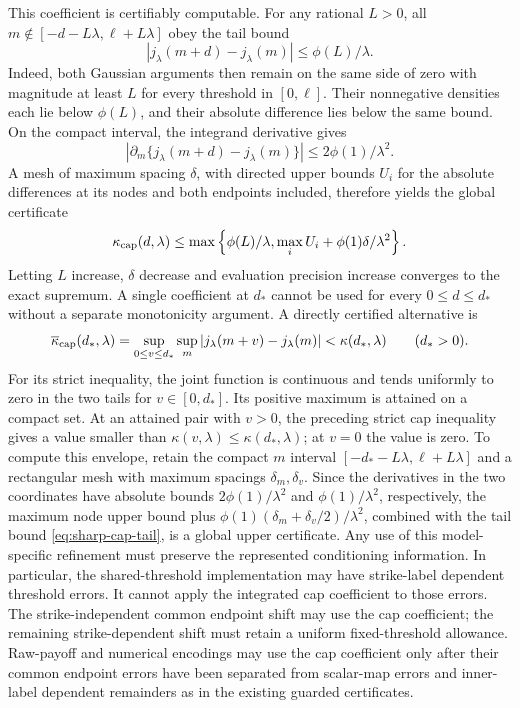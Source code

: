 \documentclass[11pt]{article}
\begin{document}
This coefficient is certifiably computable. For any rational $L>0$, all
$m\notin[-d-L\lambda,\ell+L\lambda]$ obey the tail bound
\begin{equation}
 |j_\lambda(m+d)-j_\lambda(m)|\leq\phi(L)/\lambda.
 \label{eq:sharp-cap-tail}
\end{equation}
Indeed, both Gaussian arguments then remain on the same side of zero
with magnitude at least $L$ for every threshold in $[0,\ell]$.
Their nonnegative densities each lie below $\phi(L)$, and their
absolute difference lies below the same bound. On the compact interval,
the integrand derivative gives
\begin{equation}
 |\partial_m\{j_\lambda(m+d)-j_\lambda(m)\}|
                         \leq2\phi(1)/\lambda^2.
 \label{eq:sharp-cap-mesh-Lipschitz}
\end{equation}
A mesh of maximum spacing $\delta$, with directed upper bounds $U_i$
for the absolute differences at its nodes and both endpoints included,
therefore yields the global certificate
\begin{equation}
 \kappa_{\rm cap}(d,\lambda)
 \leq\max\left\{\phi(L)/\lambda,
                       \max_i U_i+\phi(1)\delta/\lambda^2\right\}.
 \label{eq:sharp-cap-mesh-certificate}
\end{equation}
Letting $L$ increase, $\delta$ decrease and evaluation precision increase
converges to the exact supremum. A single coefficient at $d_*$ cannot be
used for every $0\leq d\leq d_*$ without a separate monotonicity argument.
A directly certified alternative is
\begin{equation}
 \overline\kappa_{\rm cap}(d_*,\lambda)
 =\sup_{0\leq v\leq d_*}\sup_m
                  |j_\lambda(m+v)-j_\lambda(m)|
 <\kappa(d_*,\lambda)\qquad(d_*>0).
 \label{eq:sharp-cap-uniform-gap-envelope}
\end{equation}
For its strict inequality, the joint function is continuous and tends
uniformly to zero in the two tails for $v\in[0,d_*]$. Its positive
maximum is attained on a compact set. At an attained pair with $v>0$,
the preceding strict cap inequality gives a value smaller than
$\kappa(v,\lambda)\leq\kappa(d_*,\lambda)$; at $v=0$ the value is zero.
To compute this envelope, retain the compact $m$ interval
$[-d_*-L\lambda,\ell+L\lambda]$ and a rectangular mesh with maximum
spacings $\delta_m,\delta_v$. Since the derivatives in the two
coordinates have absolute bounds $2\phi(1)/\lambda^2$ and
$\phi(1)/\lambda^2$, respectively, the maximum node upper bound plus
$\phi(1)(\delta_m+\delta_v/2)/\lambda^2$, combined with the tail
bound \eqref{eq:sharp-cap-tail}, is a global upper certificate.
Any use of this model-specific refinement
must preserve the represented conditioning information. In particular,
the shared-threshold implementation may have strike-label dependent
threshold errors. It cannot apply the integrated cap coefficient to
those errors. The strike-independent common endpoint shift may use the
cap coefficient; the remaining strike-dependent shift must retain a
uniform fixed-threshold allowance. Raw-payoff and numerical encodings
may use the cap coefficient only after their common endpoint errors have
been separated from scalar-map errors and inner-label dependent
remainders as in the existing guarded certificates.
\end{document}

